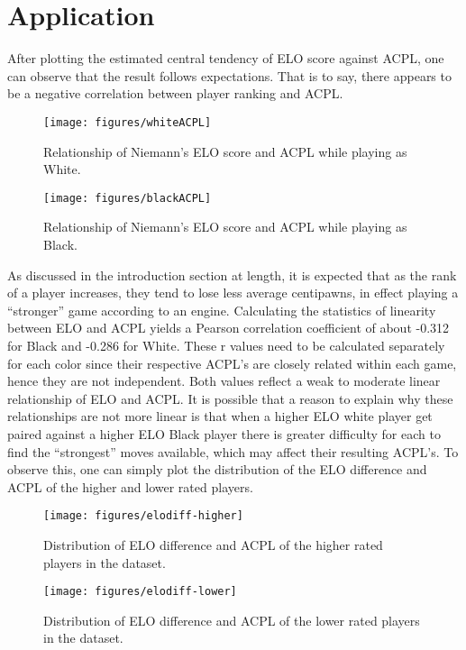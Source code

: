 \documentclass[12pt, letterpaper, titlepage]{article}
\begin{document}
\section*{Application}
\label{sec:app}

After plotting the estimated central tendency of ELO score against ACPL, one can observe that the result follows expectations. That is to say, there appears to be a negative correlation between player ranking and ACPL. 

\begin{figure}[!htb]
    \centering
    \texttt{[image: figures/whiteACPL]}
    \caption{Relationship of Niemann's ELO score and ACPL while playing as White.}
    \label{fig:white_acpl}
\end{figure}

\begin{figure}[!htb]
    \centering
    \texttt{[image: figures/blackACPL]}
    \caption{Relationship of Niemann's ELO score and ACPL while playing as Black.}
    \label{fig:black_acpl}
\end{figure}

As discussed in the introduction section at length, it is expected that as the rank of a player increases, they tend to lose less average centipawns, in effect playing a “stronger” game according to an engine. Calculating the statistics of linearity between ELO and ACPL yields a Pearson correlation coefficient of about -0.312 for Black and -0.286 for White. These r values need to be calculated separately for each color since their respective ACPL's are closely related within each game, hence they are not independent. Both values reflect a weak to moderate linear relationship of ELO and ACPL. It is possible that a reason to explain why these relationships are not more linear is that when a higher ELO white player get paired against a higher ELO Black player there is greater difficulty for each to find the “strongest” moves available, which may affect their resulting ACPL's. To observe this, one can simply plot the distribution of the ELO difference and ACPL of the higher and lower rated players.

\begin{figure}[!htb]
    \centering
    \texttt{[image: figures/elodiff-higher]}
    \caption{Distribution of ELO difference and ACPL of the higher rated players in the dataset.}
    \label{fig:elodiff-higher}
\end{figure}

\begin{figure}[!htb]
    \centering
    \texttt{[image: figures/elodiff-lower]}
    \caption{Distribution of ELO difference and ACPL of the lower rated players in the dataset.}
    \label{fig:elodiff-lower}
\end{figure}
\end{document}
